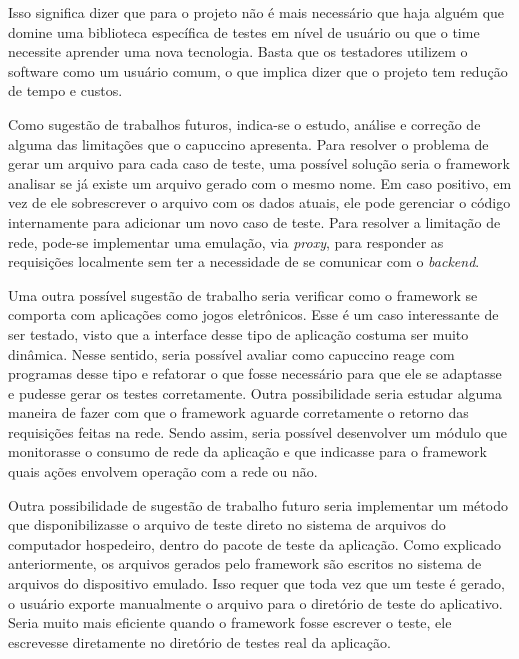 \documentclass[
    12pt,       %
    openright,      %
    twoside,      %
    a4paper,      %
    english,      %
    french,       %
    spanish,      %
    brazil,       %
    ]{abntex2}
\begin{document}
      Isso significa dizer que para o projeto não é mais necessário que haja alguém que domine uma biblioteca
      específica de testes em nível de usuário ou que o time necessite aprender uma nova tecnologia. Basta
      que os testadores utilizem o software como um usuário comum, o que implica dizer que o projeto tem
      redução de tempo e custos.

      Como sugestão de trabalhos futuros, indica-se o estudo, análise e correção de alguma das limitações
      que o capuccino apresenta. Para resolver o problema de gerar um arquivo para cada caso de teste,
      uma possível solução seria o framework analisar se já existe um arquivo gerado com o mesmo nome. Em
      caso positivo, em vez de ele sobrescrever o arquivo com os dados atuais, ele pode gerenciar o código
      internamente para adicionar um novo caso de teste. Para resolver a limitação de rede, pode-se
      implementar uma emulação, via \textit{proxy}, para responder as requisições localmente sem ter
      a necessidade de se comunicar com o \textit{backend}.

      Uma outra possível sugestão de trabalho seria verificar como o framework se comporta com aplicações
      como jogos eletrônicos. Esse é um caso interessante de ser testado, visto que a interface desse
      tipo de aplicação costuma ser muito dinâmica. Nesse sentido, seria possível avaliar como capuccino
      reage com programas desse tipo e refatorar o que fosse necessário para que ele se adaptasse e pudesse
      gerar os testes corretamente. Outra possibilidade seria estudar alguma maneira de fazer com que o
      framework aguarde corretamente o retorno das requisições feitas na rede. Sendo assim, seria possível
      desenvolver um módulo que monitorasse o consumo de rede da aplicação e que indicasse para o framework
      quais ações envolvem operação com a rede ou não.

      Outra possibilidade de sugestão de trabalho futuro seria implementar um método que disponibilizasse o
      arquivo de teste direto no sistema de arquivos do computador hospedeiro, dentro do pacote de teste
      da aplicação. Como explicado anteriormente, os arquivos gerados pelo framework são escritos no sistema
      de arquivos do dispositivo emulado. Isso requer que toda vez que um teste é gerado, o usuário exporte
      manualmente o arquivo para o diretório de teste do aplicativo. Seria muito mais eficiente quando o
      framework fosse escrever o teste, ele escrevesse diretamente no diretório de testes real da aplicação.
\end{document}
